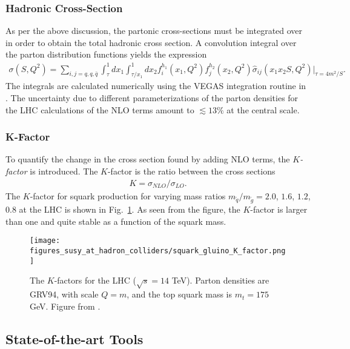 \documentclass[twoside,english]{uiofysmaster}
\begin{document}
{\subsubsection{Hadronic Cross-Section}

As per the above discussion, the partonic cross-sections must be integrated over in order to obtain the total hadronic cross section. A convolution integral over the parton distribution functions yields the expression 
\begin{align}
\sigma(S, Q^2) = \sum_{i,j=q, q, \bar{q}} \int_{\tau}^1dx_1 \int_{\tau/x_1}^1 dx_2 f_i^{h_1} (x_1, Q^2) f_j^{h_2}(x_2, Q^2) \hat{\sigma}_{ij} (x_1x_2S, Q^2)\Big|_{\tau=4m^2/S}.
\end{align}
The integrals are calculated numerically using the VEGAS integration routine \cite{PETERLEPAGE1978192} in \cite{beenakker1997squark}.
The uncertainty due to different parameterizations of the parton densities for the LHC calculations of the NLO terms amount to $\lesssim 13 \%$ at the central scale.

\subsubsection{K-Factor}

To quantify the change in the cross section found by adding NLO terms, the \textit{$K$-factor} is introduced. The $K$-factor is the ratio between the cross sections
\begin{align}
K = \sigma_{NLO}/\sigma_{LO}.
\end{align}
The $K$-factor for squark production for varying mass ratios $m_{\widetilde{q}}/m_{\widetilde{g}}=2.0$, $ 1.6$, $1.2$, $0.8$ at the LHC is shown in Fig.\ \ref{Fig:: susy hadron : K-factor LHC}. As seen from the figure, the $K$-factor is larger than one and quite stable as a function of the squark mass. 

\begin{figure}
\centering
\texttt{[image: figures\_susy\_at\_hadron\_colliders/squark\_gluino\_K\_factor.png]}
\caption{The $K$-factors for the LHC ($\sqrt{s}=14$ TeV). Parton densities are GRV94, with scale $Q=m$, and the top squark mass is $m_t=175$ GeV. Figure from \cite{beenakker1997squark}.}
\label{Fig:: susy hadron : K-factor LHC}
\end{figure}


\subsection{State-of-the-art Tools}

}
\end{document}
